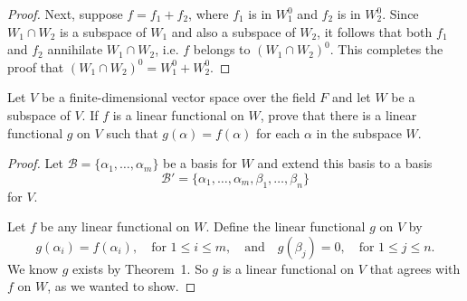\begin{enumerate}
\begin{proof}
    Next, suppose $f = f_1 + f_2$, where $f_1$ is in $W_1^0$ and $f_2$
    is in $W_2^0$. Since $W_1\cap W_2$ is a subspace of $W_1$ and also
    a subspace of $W_2$, it follows that both $f_1$ and $f_2$
    annihilate $W_1\cap W_2$, i.e. $f$ belongs to $(W_1\cap
    W_2)^0$. This completes the proof that
    $(W_1\cap W_2)^0 = W_1^0 + W_2^0$.
  \end{proof}
\end{enumerate}

 Let $V$ be a finite-dimensional vector space over the
field $F$ and let $W$ be a subspace of $V$. If $f$ is a linear
functional on $W$, prove that there is a linear functional $g$ on $V$
such that $g(\alpha) = f(\alpha)$ for each $\alpha$ in the subspace
$W$.
\begin{proof}
  Let $\mathcal{B} = \{\alpha_1,\dots,\alpha_m\}$ be a basis for $W$
  and extend this basis to a basis
  \begin{equation*}
    \mathcal{B}' = \{\alpha_1,\dots,\alpha_m,\beta_1,\dots,\beta_n\}
  \end{equation*}
  for $V$.

  Let $f$ be any linear functional on $W$. Define the linear
  functional $g$ on $V$ by
  \begin{equation*}
    g(\alpha_i) = f(\alpha_i),
    \quad \text{for $1\leq i\leq m$},
    \quad\text{and}\quad
    g(\beta_j) = 0,
    \quad \text{for $1\leq j\leq n$}.
  \end{equation*}
  We know $g$ exists by Theorem~1. So $g$ is a linear functional on
  $V$ that agrees with $f$ on $W$, as we wanted to show.
\end{proof}


